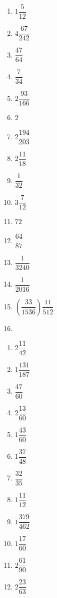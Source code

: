 
\begin{multicols}{4}
\begin{enumerate}[$(1)$]
\item $1\dfrac{5}{12}$
\item $4\dfrac{67}{242}$
\item $\dfrac{47}{64}$
\item $\dfrac{7}{34}$
\item $2\dfrac{93}{166}$
\item $2$
\item $2\dfrac{194}{203}$
\item $2\dfrac{11}{18}$
\item $\dfrac{1}{32}$
\item $3\dfrac{7}{12}$
\item $72$
\item $\dfrac{64}{87}$
\item $\dfrac{1}{3240}$
\item $\dfrac{1}{2016}$
\item $\left(\dfrac{33}{1536}\right) \dfrac{11}{512}$
\item[]
\end{enumerate}
\end{multicols}


\begin{multicols}{4}
\begin{enumerate}[$(1)$]
\item $2 \dfrac{11}{42}$ 
\item $1 \dfrac{131}{187}$
\item $\dfrac{47}{60}$
\item $2 \dfrac{13}{60}$
\item $1 \dfrac{43}{60}$
\item $ 1\dfrac{37}{48}$
\item $\dfrac{32}{35}$
\item $1\dfrac{11}{12}$
\item $1\dfrac{379}{462}$
\item $1\dfrac{17}{60}$
\item $2\dfrac{61}{90}$
\item $2 \dfrac{23}{63}$
\end{enumerate}
\end{multicols}


